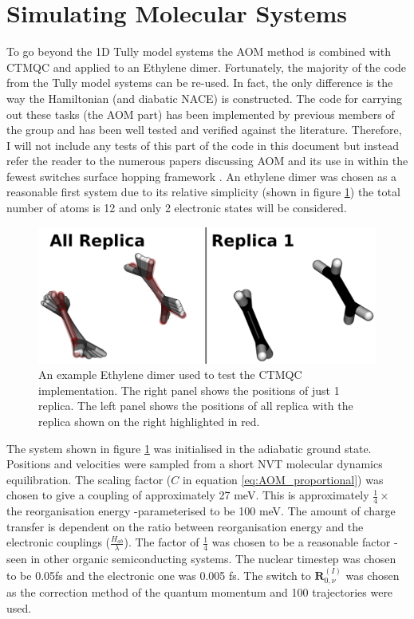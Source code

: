 \section{Simulating Molecular Systems}
To go beyond the 1D Tully model systems the AOM method is combined with CTMQC and applied to an Ethylene dimer. Fortunately, the majority of the code from the Tully model systems can be re-used. In fact, the only difference is the way the Hamiltonian (and diabatic NACE) is constructed. The code for carrying out these tasks (the AOM part) has been implemented by previous members of the group and has been well tested and verified against the literature. Therefore, I will not include any tests of this part of the code in this document but instead refer the reader to the numerous papers discussing AOM and its use in within the fewest switches surface hopping framework \cite{Carof2017FSSH, C9FD00046A, C9CP04770K, FOB-SH_Spencer,        C6FD00107F,FlickPolarons, Giannini2018Crossover, Giannini2019,          C9TC05270D,Gajdos2014, AOM_vs_HigherOrder}. An ethylene dimer was chosen as a reasonable first system due to its relative simplicity (shown in figure \ref{fig:EthDimer}) the total number of atoms is 12 and only 2 electronic states will be considered.
\begin{figure}[h]
  \includegraphics[width=\textwidth]{./img/CTMQC/Ethylene_Annotated.png}
  \caption{\label{fig:EthDimer}An example Ethylene dimer used to test the CTMQC implementation. The right panel shows the positions of just 1 replica. The left panel shows the positions of all replica with the replica shown on the right highlighted in red.}
\end{figure}
The system shown in figure \ref{fig:EthDimer} was initialised in the adiabatic ground state. Positions and velocities were sampled from a short NVT molecular dynamics equilibration. The scaling factor ($C$ in equation \eqref{eq:AOM_proportional}) was chosen to give a coupling of approximately 27 meV. This is approximately $\frac{1}{4} \times$ the reorganisation energy -parameterised to be 100 meV. The amount of charge transfer is dependent on the ratio between reorganisation energy and the electronic couplings ($\frac{H_{ab}}{\lambda}$). The factor of $\frac{1}{4}$ was chosen to be a reasonable factor -seen in other organic semiconducting systems. The nuclear timestep was chosen to be 0.05fs and the electronic one was 0.005 fs. The switch to $\mathbf{R}_{0, \nu}^{(I)}$ was chosen as the correction method of the quantum momentum and 100 trajectories were used.
